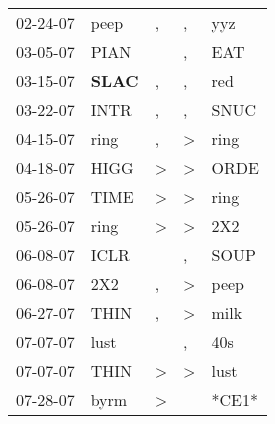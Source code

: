 \begin{supertabular}{p{0.07\textwidth}p{0.06\textwidth}p{0.02\textwidth}p{0.02\textwidth}p{0.06\textwidth}}
          02-24-07\textsuperscript{} &           peep\textsuperscript{} &                , &                , &            yyz\textsuperscript{} \\
          03-05-07\textsuperscript{} &           PIAN\textsuperscript{} &                  &                , &            EAT\textsuperscript{} \\
          03-15-07\textsuperscript{} &  \textbf{SLAC\textsuperscript{}} &                , &                , &            red\textsuperscript{} \\
          03-22-07\textsuperscript{} &           INTR\textsuperscript{} &                , &                , &           SNUC\textsuperscript{} \\
          04-15-07\textsuperscript{} &           ring\textsuperscript{} &                , &     \textgreater &           ring\textsuperscript{} \\
          04-18-07\textsuperscript{} &           HIGG\textsuperscript{} &     \textgreater &     \textgreater &           ORDE\textsuperscript{} \\
          05-26-07\textsuperscript{} &           TIME\textsuperscript{} &     \textgreater &     \textgreater &           ring\textsuperscript{} \\
          05-26-07\textsuperscript{} &           ring\textsuperscript{} &     \textgreater &     \textgreater &            2X2\textsuperscript{} \\
          06-08-07\textsuperscript{} &           ICLR\textsuperscript{} &                  &                , &           SOUP\textsuperscript{} \\
          06-08-07\textsuperscript{} &            2X2\textsuperscript{} &                , &     \textgreater &           peep\textsuperscript{} \\
          06-27-07\textsuperscript{} &           THIN\textsuperscript{} &                , &     \textgreater &           milk\textsuperscript{} \\
          07-07-07\textsuperscript{} &           lust\textsuperscript{} &                  &                , &            40s\textsuperscript{} \\
          07-07-07\textsuperscript{} &           THIN\textsuperscript{} &     \textgreater &     \textgreater &           lust\textsuperscript{} \\
          07-28-07\textsuperscript{} &           byrm\textsuperscript{} &     \textgreater &                  &                            *CE1* \\

\end{supertabular}
